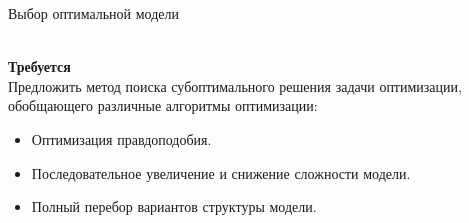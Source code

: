\documentclass[usenames,dvipsnames,11pt,pdf,utf8,russian,aspectratio=43]{beamer}
\begin{document}
\begin{frame}{Выбор оптимальной модели}

~\\
\textbf{Требуется}\\ 
Предложить метод поиска субоптимального решения задачи оптимизации, обобщающего различные алгоритмы оптимизации:
\begin{itemize}
\item Оптимизация правдоподобия.
\item Последовательное увеличение и снижение сложности модели.
\item Полный перебор вариантов структуры модели.
\end{itemize}

\end{frame}    

                                                                                                              
\end{document}
